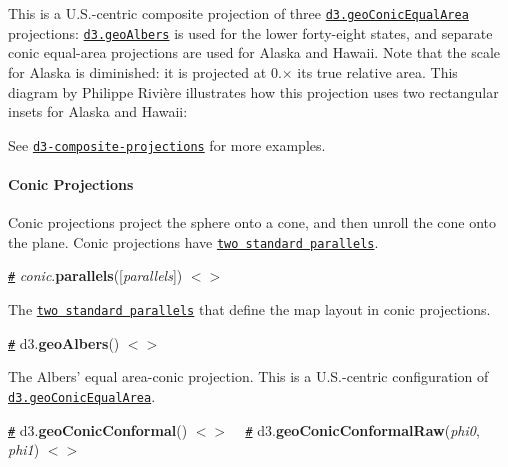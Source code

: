 This is a U.\+S.-\/centric composite projection of three \href{#geoConicEqualArea}{\tt d3.\+geo\+Conic\+Equal\+Area} projections\+: \href{#geoAlbers}{\tt d3.\+geo\+Albers} is used for the lower forty-\/eight states, and separate conic equal-\/area projections are used for Alaska and Hawaii. Note that the scale for Alaska is diminished\+: it is projected at 0.× its true relative area. This diagram by Philippe Rivière illustrates how this projection uses two rectangular insets for Alaska and Hawaii\+:

\href{https://bl.ocks.org/Fil/7723167596af40d9159be34ffbf8d36b}{\tt }

See \href{http://geoexamples.com/d3-composite-projections/}{\tt d3-\/composite-\/projections} for more examples.

\paragraph*{Conic Projections}

Conic projections project the sphere onto a cone, and then unroll the cone onto the plane. Conic projections have \href{#conic_parallels}{\tt two standard parallels}.

\href{#conic_parallels}{\tt \#} {\itshape conic}.{\bfseries parallels}(\mbox{[}{\itshape parallels}\mbox{]}) \href{https://github.com/d3/d3-geo/blob/master/src/projection/conic.js#L10}{\tt $<$$>$}

The \href{https://en.wikipedia.org/wiki/Map_projection#Conic}{\tt two standard parallels} that define the map layout in conic projections.

\href{#geoAlbers}{\tt \#} d3.{\bfseries geo\+Albers}() \href{https://github.com/d3/d3-geo/blob/master/src/projection/albers.js}{\tt $<$$>$}

\href{https://bl.ocks.org/mbostock/3734308}{\tt }

The Albers’ equal area-\/conic projection. This is a U.\+S.-\/centric configuration of \href{#geoConicEqualArea}{\tt d3.\+geo\+Conic\+Equal\+Area}.

\href{#geoConicConformal}{\tt \#} d3.{\bfseries geo\+Conic\+Conformal}() \href{https://github.com/d3/d3-geo/blob/master/src/projection/conicConformal.js}{\tt $<$$>$} ~\newline
\href{#geoConicConformalRaw}{\tt \#} d3.{\bfseries geo\+Conic\+Conformal\+Raw}({\itshape phi0}, {\itshape phi1}) \href{https://github.com/d3/d3-geo/blob/master/src/projection/conicConformal.js}{\tt $<$$>$}

\href{https://bl.ocks.org/mbostock/3734321}{\tt }

